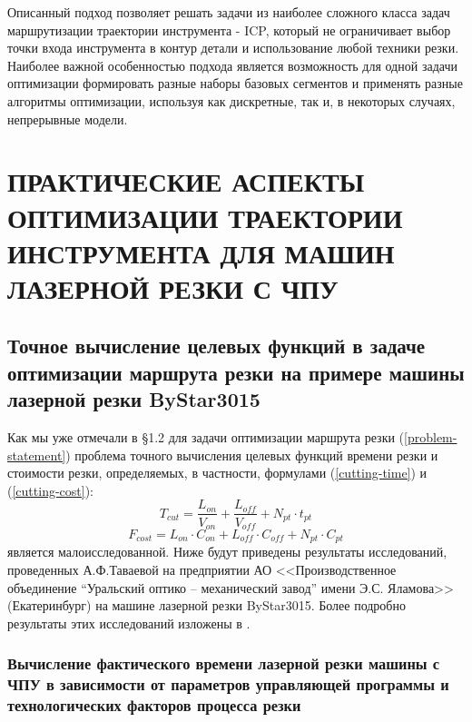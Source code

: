 \documentclass[11pt,twoside]{report}
\newcounter{lem}
\begin{document}
Описанный подход позволяет решать задачи из
наиболее сложного класса задач маршрутизации
траектории инструмента - ICP,
который не ограничивает выбор точки входа
инструмента в контур детали и использование
любой техники резки.
Наиболее важной особенностью подхода
является возможность для одной задачи оптимизации
формировать разные наборы базовых сегментов и
применять разные алгоритмы оптимизации,
используя как дискретные, так и,
в некоторых случаях, непрерывные модели.
















\chapter{ПРАКТИЧЕСКИЕ АСПЕКТЫ ОПТИМИЗАЦИИ ТРАЕКТОРИИ ИНСТРУМЕНТА ДЛЯ МАШИН ЛАЗЕРНОЙ РЕЗКИ С ЧПУ}
\setcounter{chapter}{2}
\setcounter{equation}{0}

\section{Точное вычисление целевых функций в задаче оптимизации маршрута резки на примере машины лазерной резки ByStar3015}

Как мы уже  отмечали в \S 1.2
для задачи оптимизации маршрута резки (\ref{problem-statement})
проблема точного вычисления целевых функций времени резки и стоимости резки,
определяемых, в частности, формулами (\ref{cutting-time}) и (\ref{cutting-cost}):
$$
T_{cut} = \frac{L_{on}}{V_{on}} + \frac{L_{off}}{V_{off}} +N_{pt} \cdot t_{pt}
$$
$$
F_{cost}=
L_{on} \cdot C_{on} +
L_{off} \cdot C_{off} +
N_{pt} \cdot C_{pt}
$$
является малоисследованной.
Ниже будут приведены результаты исследований,
проведенных А.Ф.Таваевой на предприятии
АО <<Производственное объединение “Уральский оптико – механический завод”
имени Э.С. Яламова>> (Екатеринбург)
на машине лазерной резки ByStar3015.
Более подробно результаты этих исследований изложены в
\cite{intro45,intro46,intro47}.

\subsection{Вычисление фактического времени лазерной резки машины с ЧПУ
в зависимости от параметров управляющей программы и технологических факторов процесса резки}
\end{document}
